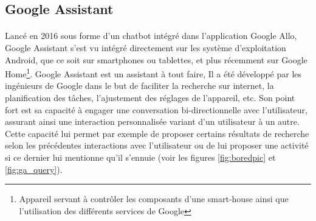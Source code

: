 \subsection{Google Assistant}\label{googleass}
\paragraph{}
Lancé en 2016 sous forme d'un chatbot intégré dans l'application Google Allo,  Google Assistant s'est vu intégré directement sur les système d'exploitation Android, que ce soit sur smartphones ou tablettes, et plus récemment sur Google Home\footnote{Appareil servant à contrôler les composants d'une smart-house ainsi que l'utilisation des différents services de Google}. Google Assistant est un assistant à tout faire, Il a été développé par les ingénieurs de Google dans le but de faciliter la recherche sur internet, la planification des tâches, l'ajustement des réglages de l'appareil, etc. Son point fort est sa capacité à engager une conversation bi-directionnelle avec l'utilisateur, assurant ainsi une interaction personnalisée variant d'un utilisateur à un autre. Cette capacité lui permet par exemple de proposer certains résultats de recherche selon les précédentes interactions avec l'utilisateur ou de lui proposer une activité si ce dernier lui mentionne qu'il s'ennuie (voir les figures \ref{fig:boredpic} et \ref{fig:ga_query}).



